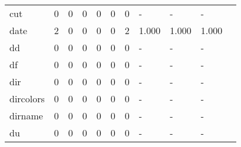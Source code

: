 \begin{longtable}{lp{1.10cm}p{1.10cm}p{1.10cm}p{1.10cm}p{1.10cm}p{1.10cm}p{1.10cm}p{1.10cm}p{1.10cm}p{1.10cm}}
cut       &                      0 &                                  0 &                                 0 &                                0 &                                 0 &                               0 &                              - &                                     - &                                   - \\
date      &                      2 &                                  0 &                                 0 &                                0 &                                 0 &                               2 &                          1.000 &                                 1.000 &                               1.000 \\
dd        &                      0 &                                  0 &                                 0 &                                0 &                                 0 &                               0 &                              - &                                     - &                                   - \\
df        &                      0 &                                  0 &                                 0 &                                0 &                                 0 &                               0 &                              - &                                     - &                                   - \\
dir       &                      0 &                                  0 &                                 0 &                                0 &                                 0 &                               0 &                              - &                                     - &                                   - \\
dircolors &                      0 &                                  0 &                                 0 &                                0 &                                 0 &                               0 &                              - &                                     - &                                   - \\
dirname   &                      0 &                                  0 &                                 0 &                                0 &                                 0 &                               0 &                              - &                                     - &                                   - \\
du        &                      0 &                                  0 &                                 0 &                                0 &                                 0 &                               0 &                              - &                                     - &                                   - \\

\end{longtable}
